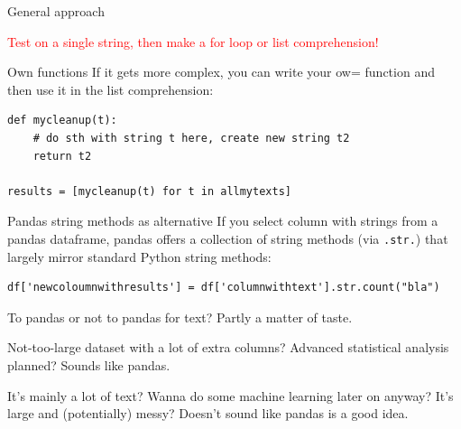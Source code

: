 \documentclass[compress]{beamer}
\begin{document}
\begin{frame}[fragile]{General approach}
\Large

\textcolor{red}{Test on a single string, then make a for loop or list comprehension!}

\pause

\normalsize

\begin{alertblock}{Own functions}
If it gets more complex, you can write your ow= function and then use it in the list comprehension:
\begin{lstlisting}
def mycleanup(t):
    # do sth with string t here, create new string t2
    return t2

results = [mycleanup(t) for t in allmytexts]
\end{lstlisting}
\end{alertblock}
\end{frame}


\begin{frame}[fragile]{Pandas string methods as alternative}
If you select column with strings from a pandas dataframe, pandas offers a collection of string methods (via \texttt{.str.}) that largely mirror standard Python string methods:

\begin{lstlisting}
df['newcoloumnwithresults'] = df['columnwithtext'].str.count("bla")
\end{lstlisting} 


\pause

\begin{alertblock}{To pandas or not to pandas for text?}
Partly a matter of taste. 

Not-too-large dataset with a lot of extra columns? Advanced statistical analysis planned? Sounds like pandas.

It's mainly a lot of text? Wanna do some machine learning later on anyway? It's large and (potentially) messy? Doesn't sound like pandas is a good idea.
\end{alertblock}

\end{frame}



\end{document}
